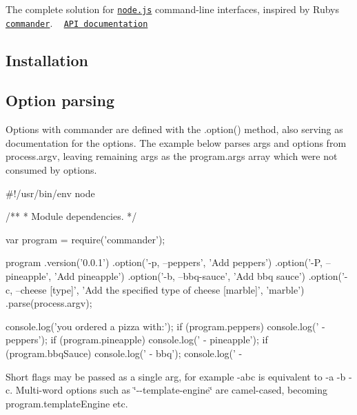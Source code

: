 \href{http://travis-ci.org/tj/commander.js}{\tt } \href{https://www.npmjs.org/package/commander}{\tt } \href{https://www.npmjs.org/package/commander}{\tt } \href{https://gitter.im/tj/commander.js?utm_source=badge&utm_medium=badge&utm_campaign=pr-badge&utm_content=badge}{\tt }

The complete solution for \href{http://nodejs.org}{\tt node.\+js} command-\/line interfaces, inspired by Ruby\textquotesingle{}s \href{https://github.com/tj/commander}{\tt commander}. ~\newline
 \href{http://tj.github.com/commander.js/}{\tt A\+PI documentation}

\subsection*{Installation}



\subsection*{Option parsing}

Options with commander are defined with the {\ttfamily .option()} method, also serving as documentation for the options. The example below parses args and options from {\ttfamily process.\+argv}, leaving remaining args as the {\ttfamily program.\+args} array which were not consumed by options.


\begin{DoxyCode}
#!/usr/bin/env node

/**
 * Module dependencies.
 */

var program = require('commander');

program
  .version('0.0.1')
  .option('-p, --peppers', 'Add peppers')
  .option('-P, --pineapple', 'Add pineapple')
  .option('-b, --bbq-sauce', 'Add bbq sauce')
  .option('-c, --cheese [type]', 'Add the specified type of cheese [marble]', 'marble')
  .parse(process.argv);

console.log('you ordered a pizza with:');
if (program.peppers) console.log('  - peppers');
if (program.pineapple) console.log('  - pineapple');
if (program.bbqSauce) console.log('  - bbq');
console.log('  - %
\end{DoxyCode}


Short flags may be passed as a single arg, for example {\ttfamily -\/abc} is equivalent to {\ttfamily -\/a -\/b -\/c}. Multi-\/word options such as \char`\"{}-\/-\/template-\/engine\char`\"{} are camel-\/cased, becoming {\ttfamily program.\+template\+Engine} etc.

